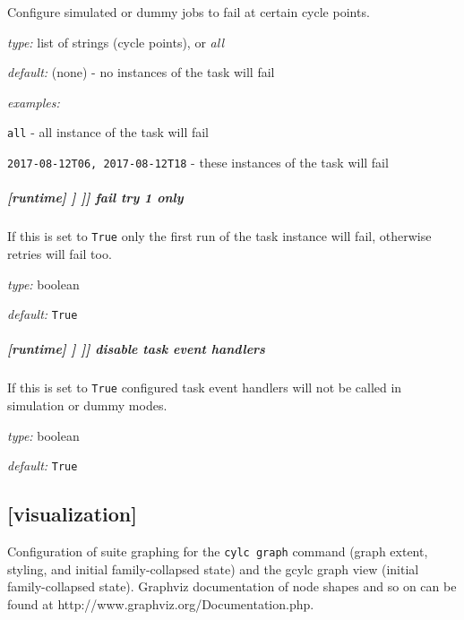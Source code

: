 Configure simulated or dummy jobs to fail at certain cycle points.

\begin{myitemize}
    \item {\em type:} list of strings (cycle points), or {\em all}
    \item {\em default:} (none) - no instances of the task will fail
    \item {\em examples:}
    \begin{myitemize}
        \item \lstinline=all= - all instance of the task will fail
        \item \lstinline=2017-08-12T06, 2017-08-12T18= - these instances of the
        task will fail
    \end{myitemize}
\end{myitemize}

\subparagraph[fail try 1 only]{[runtime] \textrightarrow [[\_\_NAME\_\_]] \textrightarrow [[[simulation]]] \textrightarrow fail try 1 only}

If this is set to \lstinline=True= only the first run of the task instance will
fail, otherwise retries will fail too.

\begin{myitemize}
    \item {\em type:} boolean
    \item {\em default:} \lstinline=True=
\end{myitemize}

\subparagraph[disable task event handlers]{[runtime] \textrightarrow [[\_\_NAME\_\_]] \textrightarrow [[[simulation]]] \textrightarrow disable task event handlers}

If this is set to \lstinline=True= configured task event handlers will not be called
in simulation or dummy modes.

\begin{myitemize}
    \item {\em type:} boolean
    \item {\em default:} \lstinline=True=
\end{myitemize}

\subsection{[visualization]}

Configuration of suite graphing for the \lstinline=cylc graph= command (graph
extent, styling, and initial family-collapsed state) and the gcylc graph view
(initial family-collapsed state). Graphviz documentation of node shapes
and so on can be found at http://www.graphviz.org/Documentation.php.

